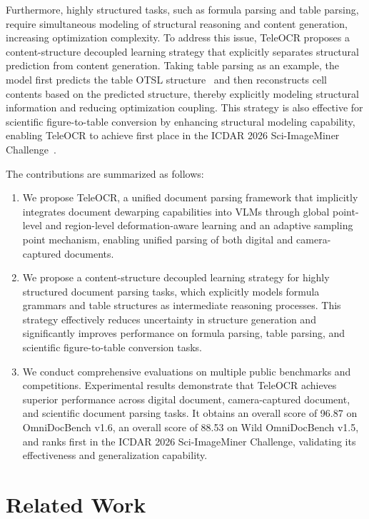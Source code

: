 \documentclass{fairmeta}
\begin{document}
Furthermore, highly structured tasks, such as formula parsing and table parsing, require simultaneous modeling of structural reasoning and content generation, increasing optimization complexity. To address this issue, TeleOCR proposes a content-structure decoupled learning strategy that explicitly separates structural prediction from content generation. Taking table parsing as an example, the model first predicts the table OTSL structure~\cite{lysak2023optimized} and then reconstructs cell contents based on the predicted structure, thereby explicitly modeling structural information and reducing optimization coupling. This strategy is also effective for scientific figure-to-table conversion by enhancing structural modeling capability, enabling TeleOCR to achieve first place in the ICDAR 2026 Sci-ImageMiner Challenge~\cite{ahmed2026icdar}.

The contributions are summarized as follows:

\begin{enumerate}
\item We propose TeleOCR, a unified document parsing framework that implicitly integrates document dewarping capabilities into VLMs through global point-level and region-level deformation-aware learning and an adaptive sampling point mechanism, enabling unified parsing of both digital and camera-captured documents.
\item We propose a content-structure decoupled learning strategy for highly structured document parsing tasks, which explicitly models formula grammars and table structures as intermediate reasoning processes. This strategy effectively reduces uncertainty in structure generation and significantly improves performance on formula parsing, table parsing, and scientific figure-to-table conversion tasks.
\item We conduct comprehensive evaluations on multiple public benchmarks and competitions. Experimental results demonstrate that TeleOCR achieves superior performance across digital document, camera-captured document, and scientific document parsing tasks. It obtains an overall score of 96.87 on OmniDocBench v1.6, an overall score of 88.53 on Wild OmniDocBench v1.5, and ranks first in the ICDAR 2026 Sci-ImageMiner Challenge, validating its effectiveness and generalization capability.
\end{enumerate}



\section{Related Work}
\label{sec:related_work}
\end{document}
